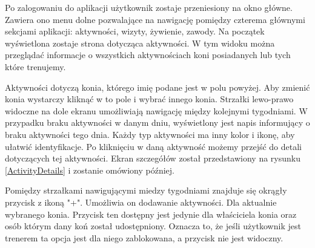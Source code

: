 \documentclass[12pt,oneside]{report}
\begin{document}
Po zalogowaniu do aplikacji użytkownik zostaje przeniesiony na okno główne. Zawiera ono menu dolne pozwalające na nawigację pomiędzy czterema głównymi sekcjami aplikacji: aktywności, wizyty, żywienie, zawody. Na początek wyświetlona zostaje  strona dotycząca aktywności. W tym widoku można przeglądać informacje o wszystkich aktywnościach koni posiadanych lub tych które trenujemy.  

Aktywności dotyczą konia, którego imię podane jest w polu powyżej. Aby zmienić konia wystarczy kliknąć w to pole i wybrać innego konia.
Strzałki lewo-prawo widoczne na dole ekranu umożliwiają nawigację między kolejnymi tygodniami. W przypadku braku aktywności w danym dniu, wyświetlony jest napis informujący o braku aktywności tego dnia. Każdy typ aktywności ma inny kolor i ikonę, aby ułatwić identyfikacje. Po kliknięciu w daną aktywność możemy przejść do detali dotyczących tej aktywności. Ekran szczegółów został przedstawiony na rysunku \ref{ActivityDetails} i zostanie omówiony później.

Pomiędzy strzałkami nawigującymi miedzy tygodniami znajduje się okrągły przycisk z ikoną "+". Umożliwia on dodawanie aktywności. Dla aktualnie wybranego konia. Przycisk ten dostępny jest jedynie dla właściciela konia oraz osób którym dany koń został udostępniony. Oznacza to, że jeśli użytkownik jest trenerem ta opcja jest dla niego zablokowana, a przycisk nie jest widoczny.
\end{document}
